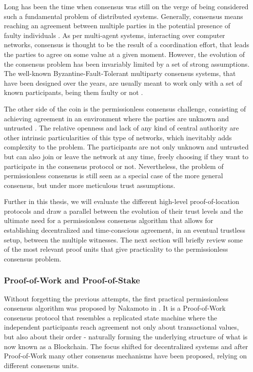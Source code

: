 Long has been the time when consensus was still on the verge of being considered such a fundamental problem of distributed systems. Generally, consensus means reaching an agreement between multiple parties in the potential presence of faulty individuals \cite{pease1980reaching, lamport2019byzantine, lamport1983weak}. As per multi-agent systems, interacting over computer networks, consensus is thought to be the result of a coordination effort, that leads the parties to agree on some value at a given moment. However, the evolution of the consensus problem has been invariably limited by a set of strong assumptions. The well-known Byzantine-Fault-Tolerant multiparty consensus systems, that have been designed over the years, are usually meant to work only with a set of known participants, being them faulty or not \cite{castro1999practical}. 

The other side of the coin is the permissionless consensus challenge, consisting of achieving agreement in an environment where the parties are unknown and untrusted \cite{nakamoto2008bitcoin, buterin2014next}. The relative openness and lack of any kind of central authority are other intrinsic particularities of this type of networks, which inevitably adds complexity to the problem. The participants are not only unknown and untrusted but can also join or leave the network at any time, freely choosing if they want to participate in the consensus protocol or not. Nevertheless, the problem of permissionless consensus is still seen as a special case of the more general consensus, but under more meticulous trust assumptions.

Further in this thesis, we will evaluate the different high-level proof-of-location protocols and draw a parallel between the evolution of their trust levels and the ultimate need for a permissionless consensus algorithm that allows for establishing decentralized and time-conscious agreement, in an eventual trustless setup, between the multiple witnesses. The next section will briefly review some of the most relevant proof units that give practicality to the permissionless consensus problem.

\subsubsection{Proof-of-Work and Proof-of-Stake}

Without forgetting the previous attempts, the first practical permissionless consensus algorithm was proposed by Nakamoto in \cite{nakamoto2008bitcoin}. It is a Proof-of-Work consensus protocol that resembles a replicated state machine where the independent participants reach agreement not only about transactional values, but also about their order - naturally forming the underlying structure of what is now known as a Blockchain. The focus shifted for decentralized systems and after Proof-of-Work many other consensus mechanisms have been proposed, relying on different consensus units.

